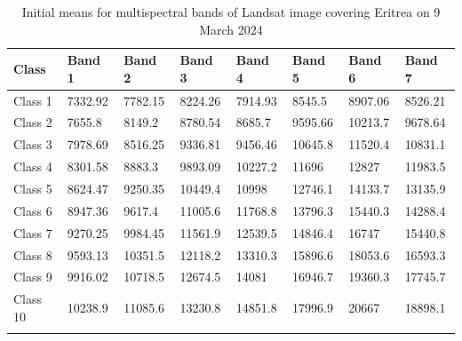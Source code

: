\documentclass[sn-mathphys-num]{sn-jnl}%
\theoremstyle{thmstyleone}%
\theoremstyle{thmstyletwo}%
\theoremstyle{thmstylethree}%
\begin{document}
\vspace{-3pt}
\begin{table}[h]
\caption{Initial means for multispectral bands of Landsat image covering Eritrea on 9 March 2024}
\begin{tabular}{@{}llllllll@{}}
\toprule 
\textbf{Class} & \textbf{Band 1} & \textbf{Band 2} & \textbf{Band 3} & \textbf{Band 4} & \textbf{Band 5} & \textbf{Band 6} & \textbf{Band 7} \\  \midrule
    Class 1 & 7332.92 & 7782.15 & 8224.26 & 7914.93 & 8545.5 & 8907.06 & 8526.21 \\
    Class 2 & 7655.8 & 8149.2 & 8780.54 & 8685.7 & 9595.66 & 10213.7 & 9678.64 \\
    Class 3 & 7978.69 & 8516.25 & 9336.81 & 9456.46 & 10645.8 & 11520.4 & 10831.1 \\
    Class 4 & 8301.58 & 8883.3 & 9893.09 & 10227.2 & 11696 & 12827 & 11983.5 \\
    Class 5 & 8624.47 & 9250.35 & 10449.4 & 10998 & 12746.1 & 14133.7 & 13135.9 \\
    Class 6 & 8947.36 & 9617.4 & 11005.6 & 11768.8 & 13796.3 & 15440.3 & 14288.4 \\
    Class 7 & 9270.25 & 9984.45 & 11561.9 & 12539.5 & 14846.4 & 16747 & 15440.8 \\
    Class 8 & 9593.13 & 10351.5 & 12118.2 & 13310.3 & 15896.6 & 18053.6 & 16593.3 \\
    Class 9 & 9916.02 & 10718.5 & 12674.5 & 14081 & 16946.7 & 19360.3 & 17745.7 \\
    Class 10 & 10238.9 & 11085.6 & 13230.8 & 14851.8 & 17996.9 & 20667 & 18898.1 \\
    \botrule
\end{tabular}
\label{tabA04}
\end{table}

\end{document}

